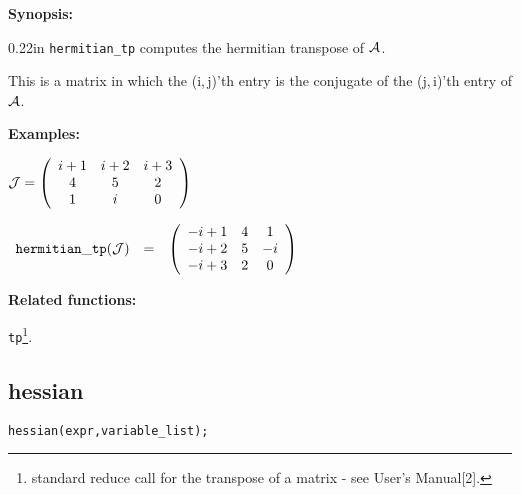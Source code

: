 {\bf Synopsis:} %

\begin{addtolength}{\leftskip}{0.22in}
                {\tt hermitian\_tp} computes the hermitian transpose of
                ${\cal A}$.

This is a matrix in which the (i,$\,$j)'th entry is the conjugate of
the (j,$\,$i)'th entry of ${\cal A}$.

\end{addtolength}

{\bf Examples:}

\begin{flushleft}
\hspace*{0.175in}
\begin{math}
{\cal J} = \left( \begin{array}{ccc} i+1 & i+2 & i+3 \\ 4 & 5 & 2 \\ 1 &
i & 0
\end{array} \right)
\end{math}
\end{flushleft}

\vspace*{0.1in}

\begin{flushleft}
\hspace*{0.1in}
\begin{math}
\begin{array}{ccc}
{\tt hermitian\_tp}({\cal J}) & = &
\left( \begin{array}{ccc} -i+1 & 4 & 1 \\ -i+2 & 5 & -i \\-i+3 & 2 & 0
\end{array} \right)
\end{array}
\end{math}
\end{flushleft}

{\bf Related functions:}

\hspace*{0.175in} {\tt tp}\footnote{standard reduce call for the
transpose of a matrix - see {\REDUCE} User's Manual[2].}.


\subsection{hessian}


\hspace*{0.175in} {\tt hessian(expr,variable\_list);}

